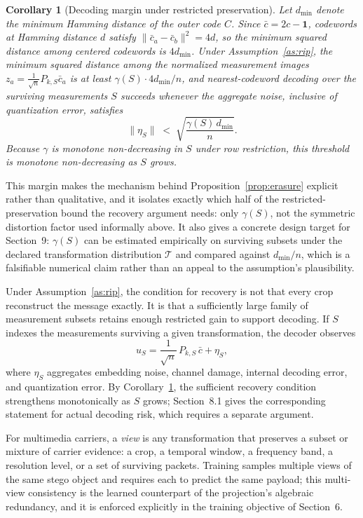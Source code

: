 \documentclass[11pt]{article}
\newtheorem{corollary}{Corollary}
\begin{document}
\begin{corollary}[Decoding margin under restricted preservation]
\label{cor:margin}
Let $d_{\min}$ denote the minimum Hamming distance of the outer code $C$. Since $\bar c = 2c-\mathbf{1}$, codewords at Hamming distance $d$ satisfy $\|\bar c_a-\bar c_b\|^2 = 4d$, so the minimum squared distance among centered codewords is $4d_{\min}$. Under Assumption~\ref{as:rip}, the minimum squared distance among the normalized measurement images $z_a = \tfrac{1}{\sqrt n}P_{k,S}\bar c_a$ is at least $\gamma(S)\cdot 4d_{\min}/n$, and nearest-codeword decoding over the surviving measurements $S$ succeeds whenever the aggregate noise, inclusive of quantization error, satisfies
\[
\|\eta_S\| \;<\; \sqrt{\frac{\gamma(S)\,d_{\min}}{n}}.
\]
Because $\gamma$ is monotone non-decreasing in $S$ under row restriction, this threshold is monotone non-decreasing as $S$ grows.
\end{corollary}

This margin makes the mechanism behind Proposition~\ref{prop:erasure} explicit rather than qualitative, and it isolates exactly which half of the restricted-preservation bound the recovery argument needs: only $\gamma(S)$, not the symmetric distortion factor used informally above. It also gives a concrete design target for Section~9: $\gamma(S)$ can be estimated empirically on surviving subsets under the declared transformation distribution $\mathcal{T}$ and compared against $d_{\min}/n$, which is a falsifiable numerical claim rather than an appeal to the assumption's plausibility.

Under Assumption~\ref{as:rip}, the condition for recovery is not that every crop reconstruct the message exactly. It is that a sufficiently large family of measurement subsets retains enough restricted gain to support decoding. If $S$ indexes the measurements surviving a given transformation, the decoder observes
\[
u_S = \frac{1}{\sqrt n}\,P_{k,S}\,\bar c + \eta_S,
\]
where $\eta_S$ aggregates embedding noise, channel damage, internal decoding error, and quantization error. By Corollary~\ref{cor:margin}, the sufficient recovery condition strengthens monotonically as $S$ grows; Section~8.1 gives the corresponding statement for actual decoding risk, which requires a separate argument.

For multimedia carriers, a \emph{view} is any transformation that preserves a subset or mixture of carrier evidence: a crop, a temporal window, a frequency band, a resolution level, or a set of surviving packets. Training samples multiple views of the same stego object and requires each to predict the same payload; this multi-view consistency is the learned counterpart of the projection's algebraic redundancy, and it is enforced explicitly in the training objective of Section~6.
\end{document}
